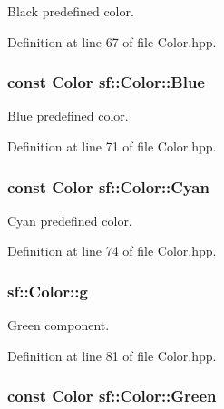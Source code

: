 Black predefined color. 



Definition at line 67 of file Color.\-hpp.

\hypertarget{classsf_1_1_color_ab03770d4817426b2614cfc33cf0e245c}{
\subsubsection[{Blue}]{\setlength{\rightskip}{0pt plus 5cm}const {\bf Color} sf\-::\-Color\-::\-Blue\hspace{0.3cm}{\ttfamily [static]}}}\label{classsf_1_1_color_ab03770d4817426b2614cfc33cf0e245c}


Blue predefined color. 



Definition at line 71 of file Color.\-hpp.

\hypertarget{classsf_1_1_color_a64ae9beb0b9a5865dd811cda4bb18340}{
\subsubsection[{Cyan}]{\setlength{\rightskip}{0pt plus 5cm}const {\bf Color} sf\-::\-Color\-::\-Cyan\hspace{0.3cm}{\ttfamily [static]}}}\label{classsf_1_1_color_a64ae9beb0b9a5865dd811cda4bb18340}


Cyan predefined color. 



Definition at line 74 of file Color.\-hpp.

\hypertarget{classsf_1_1_color_a591daf9c3c55dea830c76c962d6ba1a5}{
\subsubsection[{g}]{ sf\-::\-Color\-::g}}\label{classsf_1_1_color_a591daf9c3c55dea830c76c962d6ba1a5}


Green component. 



Definition at line 81 of file Color.\-hpp.

\hypertarget{classsf_1_1_color_a95629b30de8c6856aa7d3afed12eb865}{
\subsubsection[{Green}]{\setlength{\rightskip}{0pt plus 5cm}const {\bf Color} sf\-::\-Color\-::\-Green\hspace{0.3cm}{\ttfamily [static]}}}\label{classsf_1_1_color_a95629b30de8c6856aa7d3afed12eb865}


